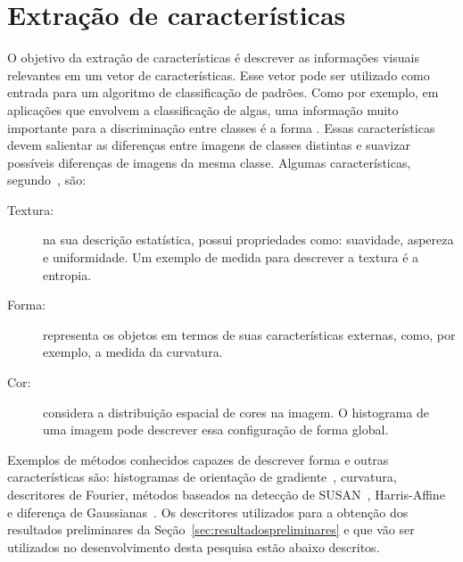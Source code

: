 \section{Extração de características}
\label{sec:extracao}

O objetivo da extração de características é descrever as informações visuais relevantes em um vetor de características. Esse vetor pode ser utilizado como entrada para um algoritmo de classificação de padrões. Como por exemplo, em aplicações que envolvem a classificação de algas, uma informação muito importante para a discriminação entre classes é a forma \cite{Borges2013}. Essas características devem salientar as diferenças entre imagens de classes distintas e suavizar possíveis diferenças de imagens da mesma classe. Algumas características, segundo~, são:

\begin{description}
\item [Textura:] na sua descrição estatística, possui propriedades como: suavidade, aspereza e uniformidade. Um exemplo de medida para descrever a textura é a entropia.
\item [Forma:] representa os objetos em termos de suas características externas, como, por exemplo, a medida da curvatura.
\item [Cor:] considera a distribuição espacial de cores na imagem. O histograma de uma imagem pode descrever essa configuração de forma global.
\end{description}

Exemplos de métodos conhecidos capazes de descrever forma e outras características são: histogramas de orientação de gradiente~\cite{Wang2009}, curvatura, descritores de Fourier, métodos baseados na detecção de SUSAN~\cite{Smith1997}, Harris-Affine~\cite{Han2005b} e diferença de Gaussianas~\cite{Lowe2004a}. Os descritores utilizados para a obtenção dos resultados preliminares da Seção~\ref{sec:resultadospreliminares} e que vão ser utilizados no desenvolvimento desta pesquisa estão abaixo descritos.

